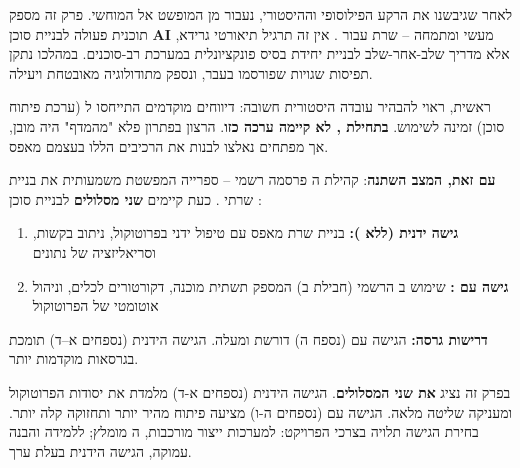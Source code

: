 
לאחר שגיבשנו את הרקע הפילוסופי וההיסטורי, נעבור מן המופשט אל המוחשי. פרק זה מספק תוכנית פעולה לבניית סוכן \textbf{AI} מעשי ומתמחה – שרת  עבור . אין זה תרגיל תיאורטי גרידא, אלא מדריך שלב-אחר-שלב לבניית יחידת בסיס פונקציונלית במערכת רב-סוכנים. במהלכו נתקן תפיסות שגויות שפורסמו בעבר, ונספק מתודולוגיה מאובטחת ויעילה.


ראשית, ראוי להבהיר עובדה היסטורית חשובה: דיווחים מוקדמים התייחסו ל (ערכת פיתוח סוכן) זמינה לשימוש. \textbf{בתחילת , לא קיימה ערכה כזו}. הרצון בפתרון פלא "מהמדף" היה מובן, אך מפתחים נאלצו לבנות את הרכיבים הללו בעצמם מאפס.

\textbf{עם זאת, המצב השתנה}: קהילת ה פרסמה  רשמי – ספרייה המפשטת משמעותית את בניית שרתי . כעת קיימים \textbf{שני מסלולים} לבניית סוכן :

\begin{enumerate}
\item \textbf{גישה ידנית (ללא ):} בניית שרת  מאפס עם טיפול ידני בפרוטוקול, ניתוב בקשות, וסריאליזציה של נתונים
\item \textbf{גישה עם :} שימוש ב הרשמי (חבילת  ב) המספק תשתית מוכנה, דקורטורים לכלים, וניהול אוטומטי של הפרוטוקול
\end{enumerate}

\textbf{דרישות גרסה:} הגישה עם  (נספח ה) דורשת  ומעלה. הגישה הידנית (נספחים א–ד) תומכת בגרסאות  מוקדמות יותר.

בפרק זה נציג \textbf{את שני המסלולים}. הגישה הידנית (נספחים א-ד) מלמדת את יסודות הפרוטוקול ומעניקה שליטה מלאה. הגישה עם  (נספחים ה-ו) מציעה פיתוח מהיר יותר ותחזוקה קלה יותר. בחירת הגישה תלויה בצרכי הפרויקט: למערכות ייצור מורכבות, ה מומלץ; ללמידה והבנה עמוקה, הגישה הידנית בעלת ערך.


